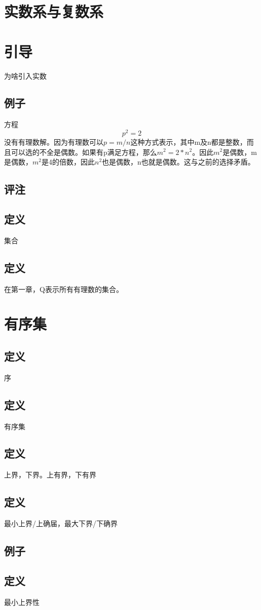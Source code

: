 \chapter{实数系与复数系}
\chapter*{引导}为啥引入实数
\section{例子}方程 \[ p^2 = 2 \] 没有有理数解。因为有理数可以\( p=m/n \)这种方式表示，其中m及n都是整数，而且可以选的不全是偶数。如果有p满足方程，那么\(m^2 = 2 * n^2\)。因此\(m^2\)是偶数，m是偶数，\(m^2\)是4的倍数，因此\(n^2\)也是偶数，n也就是偶数。这与之前的选择矛盾。
\section{评注}
\section{定义} 集合
\section{定义} 在第一章，Q表示所有有理数的集合。
\subparagraph*{}
\chapter*{有序集}
\section{定义} 序
\section{定义} 有序集
\section{定义} 上界，下界。上有界，下有界
\section{定义} 最小上界/上确届，最大下界/下确界
\section{例子} 
\section{定义} 最小上界性
